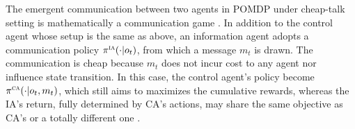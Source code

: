 \documentclass[letterpaper]{article} %
\begin{document}
The emergent communication between two agents in POMDP under cheap-talk setting is mathematically a communication game \cite{crawford82signaling,lowe2019pitfalls, tao23pot, yang-tao25misinformation}. In addition to the control agent whose setup is the same as above, an information agent adopts a communication policy $\pi^{\textsc{ia}}(\cdot|o_t)$, from which a message $m_t$ is drawn. The communication is cheap because $m_t$ does not incur cost to any agent nor influence state transition. In this case, the control agent's policy become $\pi^{\textsc{ca}}(\cdot|o_t, m_t)$, which still aims to maximizes the cumulative rewards, whereas the IA's return, fully determined by CA's actions, may share the same objective as CA's \cite{sukhbaatar16comm} or a totally different one \cite{crawford82signaling, tao23pot}.  





\end{document}
